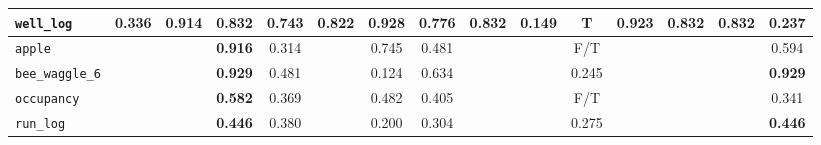 \begin{tabular}{lcccccccccccccc}
\verb+well_log+ & 0.336 & 0.914 & 0.832 & 0.743 & 0.822 & \textbf{0.928} & 0.776 & 0.832 & 0.149 & T & 0.923 & 0.832 & 0.832 & 0.237\\
\hline
\verb+apple+ &  &  & \textbf{0.916} & 0.314 &  & 0.745 & 0.481 &  &  & F/T &  &  &  & 0.594\\
\verb+bee_waggle_6+ &  &  & \textbf{0.929} & 0.481 &  & 0.124 & 0.634 &  &  & 0.245 &  &  &  & \textbf{0.929}\\
\verb+occupancy+ &  &  & \textbf{0.582} & 0.369 &  & 0.482 & 0.405 &  &  & F/T &  &  &  & 0.341\\
\verb+run_log+ &  &  & \textbf{0.446} & 0.380 &  & 0.200 & 0.304 &  &  & 0.275 &  &  &  & \textbf{0.446}\\
\hline
\end{tabular}
